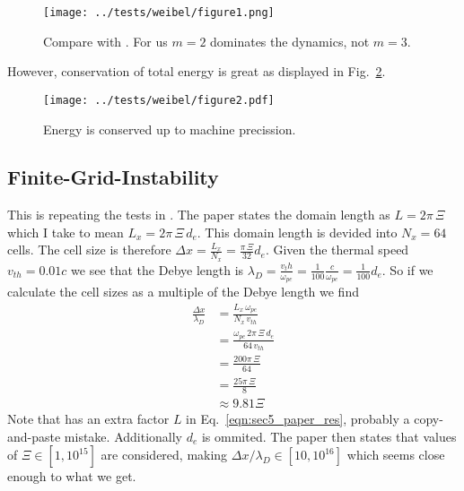 \documentclass[%
preprint,
amsmath,amssymb,
aps,
]{revtex4-2}
\begin{document}
\begin{figure}
    \centering
    \texttt{[image: ../tests/weibel/figure1.png]}
    \caption{Compare with \cite[figure 4]{LAPENTA2017349}. For us $m=2$ dominates the dynamics, not $m=3$.}
    \label{fig:weibel_fig4}
\end{figure}

However, conservation of total energy is great as displayed in Fig.~\ref{fig:weibel_fig5}.

\begin{figure}
    \centering
    \texttt{[image: ../tests/weibel/figure2.pdf]}
    \caption{Energy is conserved up to machine precission.}
    \label{fig:weibel_fig5}
\end{figure}

\FloatBarrier

\subsection{Finite-Grid-Instability}

This is repeating the tests in \cite[Section 5]{LAPENTA2017349}. The paper
states the domain length as $L = 2\pi\,\Xi$ which I take to mean $L_x =
2\pi\,\Xi\,d_e$. This domain length is devided into $N_x = 64$ cells. The cell
size is therefore $\Delta{x} = \frac{L_x}{N_x} = \frac{\pi\,\Xi}{32}d_e$. Given
the thermal speed $v_{th} = 0.01 c$ we see that the Debye length is $\lambda_D
= \frac{v_th}{\omega_{pe}} = \frac{1}{100}\frac{c}{\omega_{pe}} = \frac{1}{100}
d_e$. So if we calculate the cell sizes as a multiple of the Debye length we
find
\begin{align}
    \frac{\Delta{x}}{\lambda_D} &= \frac{L_x\,\omega_{pe}}{N_x\, v_{th}}\\
        &= \frac{\omega_{pe}\,2\pi\,\Xi\,d_e}{64\, v_{th}} \label{eqn:sec5_paper_res} \\
        &= \frac{200\pi\,\Xi}{64} \\
        &= \frac{25\pi\,\Xi}{8} \\
        &\approx 9.81 \Xi
\end{align}
Note that \cite{LAPENTA2017349} has an extra factor $L$ in
Eq.~\eqref{eqn:sec5_paper_res}, probably a copy-and-paste mistake. Additionally
$d_e$ is ommited. The paper then states that values of $\Xi \in [1,10^{15}]$
are considered, making $\Delta{x}/\lambda_D \in [10,10^{16}]$ which seems close
enough to what we get.
\end{document}
